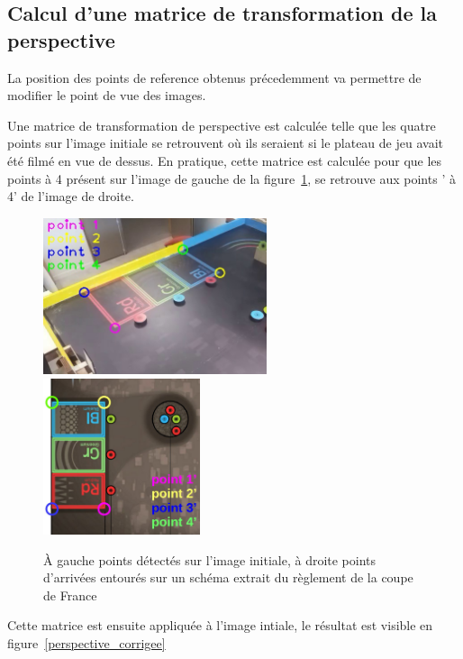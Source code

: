 \documentclass{report}
\begin{document}
\subsection{Calcul d'une matrice de transformation de la perspective}
La position des points de reference obtenus précedemment va permettre de modifier le point de vue des images.

Une matrice de transformation de perspective est calculée telle que les quatre points sur l'image initiale se retrouvent
où ils seraient si le plateau de jeu avait été filmé en vue de dessus. En pratique, cette matrice est calculée pour que les points  à 4
présent sur l'image de gauche de la figure~\ref{modif_perspective}, se retrouve aux points ' à 4' de l'image de droite.

\begin{figure}[!h]
\begin{center}
\includegraphics[height=130pt]{image_4_points.jpg}
\includegraphics[height=130pt]{modif_perspective.jpg}
\end{center}
\caption{À gauche points détectés sur l'image initiale, à droite points d'arrivées entourés sur un schéma extrait du règlement de la coupe de France}
\label{modif_perspective}
\end{figure}

Cette matrice est ensuite appliquée à l'image intiale, le résultat est visible en figure~\ref{perspective_corrigee}
\end{document}

